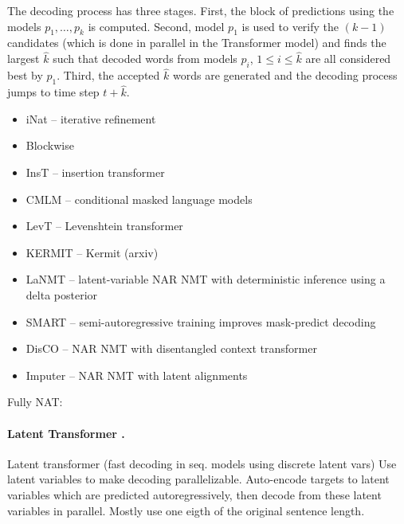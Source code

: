 The decoding process has three stages. First, the block of predictions using the
models $p_1, \ldots, p_k$ is computed. Second, model $p_1$ is used to verify the
$(k-1)$ candidates (which is done in parallel in the Transformer model) and
finds the largest $\hat{k}$ such that decoded words from models $p_i$,
$1 \leq i \leq \hat{k}$ are all considered best by $p_1$. Third, the accepted
$\hat{k}$ words are generated and the decoding process jumps to time step
$t + \hat{k}$.








\begin{itemize}
\item iNat \citep{lee2018deterministic} -- iterative refinement
\item Blockwise \citep{stern2018blockwise}
\item InsT \citep{stern2019insertion} -- insertion transformer
\item CMLM \citep{ghazvininejad2019mask} -- conditional masked language models
\item LevT \citep{gu2019levenshtein} -- Levenshtein transformer
\item KERMIT \citep{chan2019kermit} -- Kermit (arxiv)
\item LaNMT \citep{shu2020latent} -- latent-variable NAR NMT with deterministic inference using a delta posterior
\item SMART \citep{ghazvininejad2020semiautoregressive} -- semi-autoregressive training improves mask-predict decoding
\item DisCO \citep{kasai2020nonautoregressive} -- NAR NMT with disentangled context transformer
\item Imputer \citep{saharia2020nonautoregressive} -- NAR NMT with latent alignments
\end{itemize}

Fully NAT:



\paragraph{Latent Transformer \citep{kaiser2018fast}.} Latent transformer (fast
decoding in seq. models using discrete latent vars) Use latent variables to make
decoding parallelizable. Auto-encode targets to latent variables which are
predicted autoregressively, then decode from these latent variables in
parallel. Mostly use one eigth of the original sentence length.

